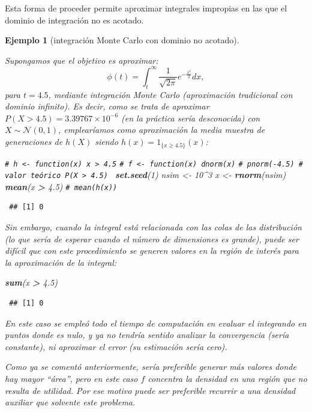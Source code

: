 \documentclass[
  spanish,
  10pt,
]{book}
\newenvironment{Shaded}{\begin{snugshade}}{\end{snugshade}}
\newcommand{\CommentTok}[1]{\textcolor[rgb]{0.56,0.35,0.01}{\textit{#1}}}
\newcommand{\DecValTok}[1]{\textcolor[rgb]{0.00,0.00,0.81}{#1}}
\newcommand{\FloatTok}[1]{\textcolor[rgb]{0.00,0.00,0.81}{#1}}
\newcommand{\FunctionTok}[1]{\textcolor[rgb]{0.13,0.29,0.53}{\textbf{#1}}}
\newcommand{\NormalTok}[1]{#1}
\newcommand{\OtherTok}[1]{\textcolor[rgb]{0.56,0.35,0.01}{#1}}
\newcommand{\SpecialCharTok}[1]{\textcolor[rgb]{0.81,0.36,0.00}{\textbf{#1}}}
\theoremstyle{break}
\newtheorem{example}{Ejemplo}[chapter]
\theoremstyle{nonumberplain}
\renewcommand{\CommentTok}[1]{\textcolor[rgb]{0.41,0.41,0.41}{\texttt{#1}}}
\begin{document}
Esta forma de proceder permite aproximar integrales impropias en las que el dominio de integración no es acotado.

\begin{example}[integración Monte Carlo con dominio no acotado]
\protect\hypertarget{exm:mc-intinf}{}\label{exm:mc-intinf}

Supongamos que el objetivo es aproximar:
\[\phi(t)=\int_{t}^{\infty}\frac1{\sqrt{2\pi}}e^{-\frac{x^2}2}dx,\]
para \(t=4.5\), mediante integración Monte Carlo (aproximación tradicional con dominio infinito).
Es decir, como se trata de aproximar \(P(X>4.5) = \ensuremath{3.39767\times 10^{-6}}\) (en la práctica sería desconocida) con \(X \sim \mathcal{N}( 0, 1 )\), emplearíamos como aproximación la media muestra de generaciones de \(h(X)\) siendo \(h(x) = 1_{\{x \ge 4.5\}}(x)\):

\begin{Shaded}
\begin{Highlighting}[]
\CommentTok{\# h \textless{}{-} function(x) x \textgreater{} 4.5}
\CommentTok{\# f \textless{}{-} function(x) dnorm(x)}
\CommentTok{\# pnorm({-}4.5)  \# valor teórico P(X \textgreater{} 4.5) }
\FunctionTok{set.seed}\NormalTok{(}\DecValTok{1}\NormalTok{)}
\NormalTok{nsim }\OtherTok{\textless{}{-}} \DecValTok{10}\SpecialCharTok{\^{}}\DecValTok{3}
\NormalTok{x }\OtherTok{\textless{}{-}} \FunctionTok{rnorm}\NormalTok{(nsim)}
\FunctionTok{mean}\NormalTok{(x }\SpecialCharTok{\textgreater{}} \FloatTok{4.5}\NormalTok{) }\CommentTok{\# mean(h(x))}
\end{Highlighting}
\end{Shaded}

\begin{verbatim}
 ## [1] 0
\end{verbatim}

Sin embargo, cuando la integral está relacionada con las colas de las distribución (lo que sería de esperar cuando el número de dimensiones es grande), puede ser difícil que
con este procedimiento se generen valores en la región de interés para la aproximación de la integral:

\begin{Shaded}
\begin{Highlighting}[]
\FunctionTok{sum}\NormalTok{(x }\SpecialCharTok{\textgreater{}} \FloatTok{4.5}\NormalTok{)}
\end{Highlighting}
\end{Shaded}

\begin{verbatim}
 ## [1] 0
\end{verbatim}

En este caso se empleó todo el tiempo de computación en evaluar el integrando en puntos donde es nulo, y ya no tendría sentido analizar la convergencia (sería constante), ni aproximar el error (su estimación sería cero).

Como ya se comentó anteriormente, sería preferible generar más valores donde hay mayor ``área'', pero en este caso \(f\) concentra la densidad en una región que no resulta de utilidad.
Por ese motivo puede ser preferible recurrir a una densidad auxiliar que solvente este problema.
\end{example}
\end{document}
